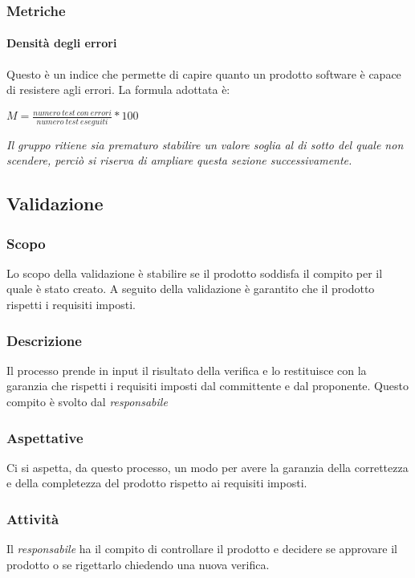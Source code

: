 \documentclass[../norme_di_progetto.tex]{subfiles}
\begin{document}
\subsubsection{Metriche}
\paragraph{Densità degli errori}
Questo è un indice che permette di capire quanto un prodotto software è capace di resistere agli errori. La formula adottata è:
\begin{center}
    \textbf{$M = \frac{numero\ test\ con\ errori}{numero\ test\ eseguiti} * 100$}
\end{center}
\emph{Il gruppo ritiene sia prematuro stabilire un valore soglia al di sotto del quale non scendere, perciò si riserva di ampliare questa sezione successivamente.}


\subsection{Validazione}

\subsubsection{Scopo}
Lo scopo della validazione è stabilire se il prodotto soddisfa il compito per il quale è stato creato. A seguito della validazione è garantito che il prodotto rispetti i requisiti imposti.

\subsubsection{Descrizione}
Il processo prende in input il risultato della verifica e lo restituisce con la garanzia che rispetti i requisiti imposti dal committente e dal proponente. Questo compito è svolto dal \emph{responsabile}

\subsubsection{Aspettative}
Ci si aspetta, da questo processo, un modo per avere la garanzia della correttezza e della completezza del prodotto rispetto ai requisiti imposti.

\subsubsection{Attività}
Il \emph{responsabile} ha il compito di controllare il prodotto e decidere se approvare il prodotto o se rigettarlo chiedendo una nuova verifica.
\end{document}

